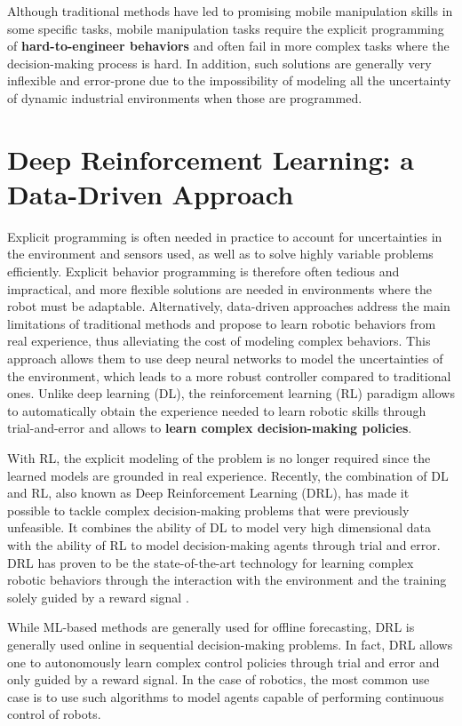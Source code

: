 Although traditional methods have led to promising mobile manipulation skills in some specific tasks,
mobile manipulation tasks require the explicit programming of \textbf{hard-to-engineer behaviors} and often fail
in more complex tasks where the decision-making process is hard. In addition, such solutions
are generally very inflexible and error-prone due to the impossibility
of modeling all the uncertainty of dynamic industrial environments when those are programmed.


\section{Deep Reinforcement Learning: a Data-Driven Approach}

Explicit programming is often needed in practice to account for uncertainties in the environment and
sensors used, as well as to solve highly variable problems efficiently.
Explicit behavior programming is therefore often tedious and impractical, and more flexible solutions
are needed in environments where the robot must be adaptable.
Alternatively, data-driven approaches address the main limitations of traditional methods and propose
to learn robotic behaviors from real experience, thus alleviating the cost of modeling complex behaviors.
This approach allows them to use deep neural networks to model the uncertainties of the environment,
which leads to a more robust controller compared to traditional ones.
Unlike deep learning (DL), the reinforcement learning (RL) paradigm allows to automatically obtain the
experience needed to learn robotic skills through trial-and-error and allows to \textbf{learn complex decision-making
	policies}.

With RL, the explicit modeling of the problem is no longer required since the learned models are grounded
in real experience. Recently, the combination of DL and RL, also known as Deep Reinforcement Learning (DRL),
has made it possible to tackle complex decision-making problems that were previously unfeasible. It combines
the ability of DL to model very high dimensional data with the ability of RL to model decision-making agents
through trial and error.
DRL has proven to be the state-of-the-art technology for learning complex
robotic behaviors through the interaction with the environment and the training solely guided
by a reward signal \cite{liu2021deep}.

While ML-based methods are generally used for offline forecasting, DRL is generally used online in
sequential decision-making problems. In fact, DRL allows one to autonomously learn complex control policies
through trial and error and only guided by a reward signal. In the case of robotics, the most common
use case is to use such algorithms to model agents capable of performing continuous control of robots.


